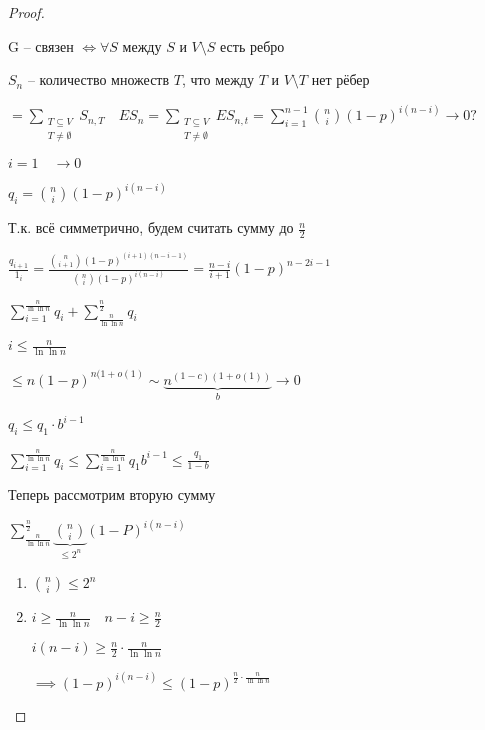 \documentclass{book}
\renewcommand\O{\ensuremath{\emptyset}}
\theoremstyle{definition}
\begin{document}
\begin{proof}
\begin{enumerate}
            \begin{problem}
                G -- связен $\iff \forall S$ между $S$ и  $V \setminus S$ есть ребро
            \end{problem}

            $S_n$ -- количество множеств  $T$, что между  $T$ и $V\setminus T$ нет рёбер

            $=\sum_{\substack{T\subseteq V\\ T\neq \O }}S_{n, T}\quad ES_n = \sum_{\substack{T\subseteq V\\ T\neq \O }} E S_{n, t} = \sum_{i=1}^{n-1} {n\choose i}(1-p)^{i(n-i)} \to 0?$ 

            $i = 1\quad \to 0$

            $q_i = {n\choose i}(1-p)^{i(n-i)}$

            Т.к. всё симметрично, будем считать сумму до $\frac{n}{2}$ 

            $\frac{q_{i+1}}{1_i} = \frac{{n\choose i+1}\left( 1-p \right) ^{(i+1)(n-i-1)}}{{n\choose i}\left( 1-p \right) ^{i(n-i)}} = \frac{n-i}{i+1}(1-p)^{n-2i-1}$ 

            $\sum_{i=1}^{\frac{n}{\ln \ln n}} q_i + \sum_{\frac{n}{\ln \ln n}}^{\frac{n}{2}} q_i$ 

            $i\leqslant \frac{n}{\ln \ln n}$ 

            $\leqslant n(1-p)^{n(1+o(1)} \sim \underbrace{n^{(1-c)(1+o(1))}}_b \to 0$ 

            $q_i \leqslant q_1\cdot b^{i-1}$

             $\sum_{i=1}^{\frac{n}{\ln \ln n}} q_i \leqslant \sum_{i=1}^{\frac{n}{\ln \ln n}} q_1b^{i-1} \leqslant \frac{q_1}{1-b}$

             Теперь рассмотрим вторую сумму

             $\sum_{\frac{n}{\ln \ln n}}^{\frac{n}{2}} \underbrace{{n\choose i}}_{\leqslant 2^n}(1-P)^{i(n-i)}$ 

             \begin{enumerate}
                 \item ${n\choose i} \leqslant 2^n$
                 \item $i\geqslant \frac{n}{\ln \ln n}\quad n-i \geqslant  \frac{n}{2}$ 

                     $i(n-i) \geqslant \frac{n}{2}\cdot \frac{n}{\ln \ln n}$ 

                     $\implies \left( 1-p \right) ^{i(n-i)} \leqslant (1-p)^{\frac{n}{2}\cdot \frac{n}{\ln \ln n}}$ 
             \end{enumerate}


\end{enumerate}
\end{proof}
\end{document}

